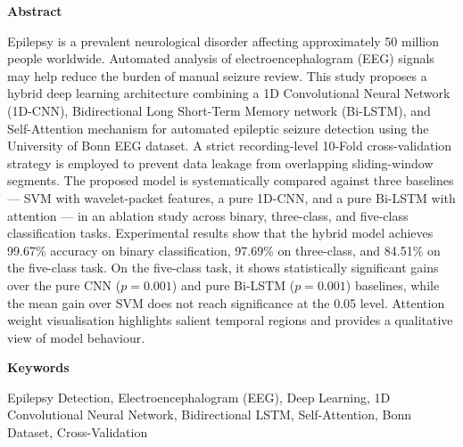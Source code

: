 \onehalfspacing
{}
{}
{\fontsize{16pt}{30pt}\selectfont \noindent\textbf{Abstract}}
\vspace{0.5cm}
{\fontsize{12pt}{18pt}\selectfont

Epilepsy is a prevalent neurological disorder affecting approximately 50 million people worldwide. Automated analysis of electroencephalogram (EEG) signals may help reduce the burden of manual seizure review. This study proposes a hybrid deep learning architecture combining a 1D Convolutional Neural Network (1D-CNN), Bidirectional Long Short-Term Memory network (Bi-LSTM), and Self-Attention mechanism for automated epileptic seizure detection using the University of Bonn EEG dataset. A strict recording-level 10-Fold cross-validation strategy is employed to prevent data leakage from overlapping sliding-window segments. The proposed model is systematically compared against three baselines --- SVM with wavelet-packet features, a pure 1D-CNN, and a pure Bi-LSTM with attention --- in an ablation study across binary, three-class, and five-class classification tasks. Experimental results show that the hybrid model achieves 99.67\% accuracy on binary classification, 97.69\% on three-class, and 84.51\% on the five-class task. On the five-class task, it shows statistically significant gains over the pure CNN ($p = 0.001$) and pure Bi-LSTM ($p = 0.001$) baselines, while the mean gain over SVM does not reach significance at the 0.05 level. Attention weight visualisation highlights salient temporal regions and provides a qualitative view of model behaviour.

}
\vspace{0.5cm}
{\fontsize{16pt}{30pt}\selectfont \noindent\textbf{Keywords}}
\vspace{0.5cm}
{\fontsize{12pt}{18pt}\selectfont

Epilepsy Detection, Electroencephalogram (EEG), Deep Learning, 1D Convolutional Neural Network, Bidirectional LSTM, Self-Attention, Bonn Dataset, Cross-Validation

}
